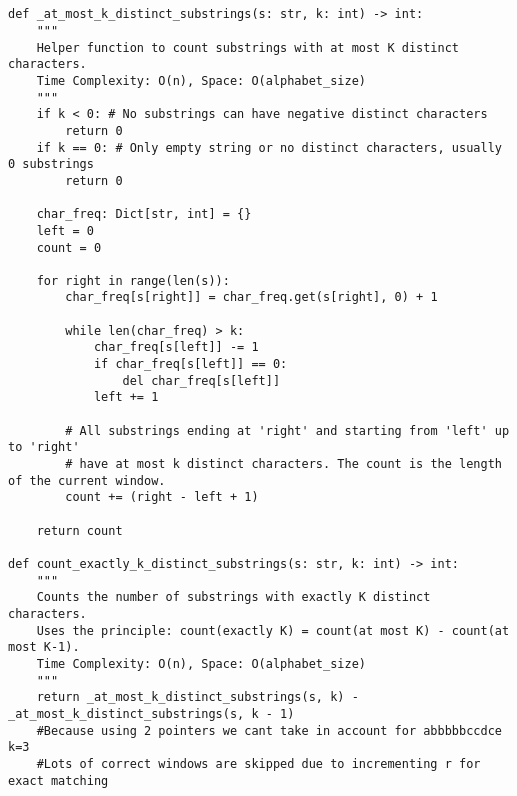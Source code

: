 \begin{verbatim}


def _at_most_k_distinct_substrings(s: str, k: int) -> int:
    """
    Helper function to count substrings with at most K distinct characters.
    Time Complexity: O(n), Space: O(alphabet_size)
    """
    if k < 0: # No substrings can have negative distinct characters
        return 0
    if k == 0: # Only empty string or no distinct characters, usually 0 substrings
        return 0

    char_freq: Dict[str, int] = {}
    left = 0
    count = 0

    for right in range(len(s)):
        char_freq[s[right]] = char_freq.get(s[right], 0) + 1
        
        while len(char_freq) > k:
            char_freq[s[left]] -= 1
            if char_freq[s[left]] == 0:
                del char_freq[s[left]]
            left += 1
        
        # All substrings ending at 'right' and starting from 'left' up to 'right'
        # have at most k distinct characters. The count is the length of the current window.
        count += (right - left + 1)
        
    return count

def count_exactly_k_distinct_substrings(s: str, k: int) -> int:
    """
    Counts the number of substrings with exactly K distinct characters.
    Uses the principle: count(exactly K) = count(at most K) - count(at most K-1). 
    Time Complexity: O(n), Space: O(alphabet_size)
    """
    return _at_most_k_distinct_substrings(s, k) - _at_most_k_distinct_substrings(s, k - 1)
    #Because using 2 pointers we cant take in account for abbbbbccdce k=3 
    #Lots of correct windows are skipped due to incrementing r for exact matching
\end{verbatim}

